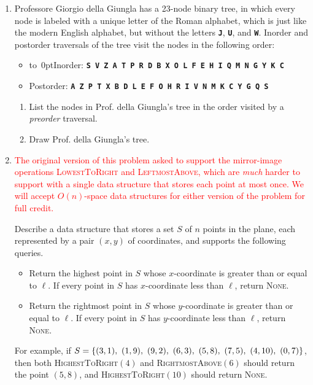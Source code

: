 \documentclass[11pt]{article}
\begin{document}
\begin{enumerate}
\begin{enumerate}
\end{enumerate}

\def\symbol#1{\textbf{\texttt{#1}}}

\item
Professore Giorgio della Giungla has a 23-node binary tree, in which every node is labeled with a unique letter of the Roman alphabet, which is just like the modern English alphabet, but without the letters \symbol{J}, \symbol{U}, and \symbol{W}.  Inorder and postorder traversals of the tree visit the nodes in the following order:
\begin{itemize}
\item
	\mbox{\hbox to 0pt{Inorder:\hss}\phantom{Postorder: }}%
	\symbol{S V Z A T P R D B X O L F E H I Q M N G Y K C}
\item Postorder:
	\symbol{A Z P T X B D L E F O H R I V N M K C Y G Q S}
\end{itemize}

\begin{enumerate}
\item
List the nodes in Prof. della Giungla's tree in the order visited by a \emph{preorder} traversal. 

\item
Draw Prof. della Giungla's tree.

\end{enumerate}

\newpage
\item
\textcolor{Red}{\textsf{The original version of this problem asked to support the mirror-image operations \textsc{\textrm{LowestToRight}} and \textsc{\textrm{LeftmostAbove}}, which are \emph{much} harder to support with a single data structure that stores each point at most once.  We will accept $O(n)$-space data structures for either version of the problem for full credit.}}

Describe a data structure that stores a set $S$ of $n$ points in the plane, each represented by a pair $(x,y)$ of coordinates, and supports the following queries.
\begin{itemize}
\item
{} Return the highest point in $S$ whose $x$-coordinate is greater than or equal to $\ell$.  If every point in $S$ has $x$-coordinate less than $\ell$, return \textsc{None}.
\item
{}  Return the rightmost point in $S$ whose $y$-coordinate is greater than or equal to $\ell$.  If every point in $S$ has $y$-coordinate less than $\ell$, return \textsc{None}.
\end{itemize}
%
For example, if $S = \left\{ (3,1),~ (1,9),~ (9,2),~ (6,3),~ (5,8),~ (7,5),~ (4,10),~ (0,7) \right\}$, then both \textsc{HighestToRight}$(4)$ and \textsc{RightmostAbove}$(6)$ should return the point $(5,8)$, and \textsc{HighestToRight}$(10)$ should return \textsc{None}.


\end{enumerate}
\end{document}
